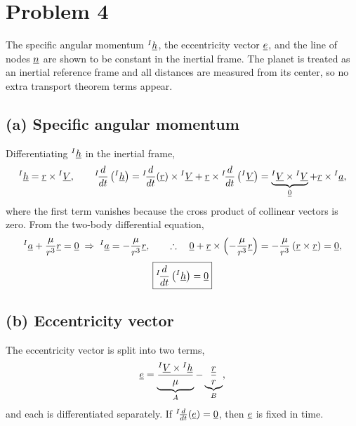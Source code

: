 \section{Problem 4}
\label{sec:problem4}

The specific angular momentum ${}^{I}\underline{h}$, the eccentricity vector $\underline{e}$, and the line of nodes $\underline{n}$ are shown to be constant in the inertial frame. The planet is treated as an inertial reference frame and all distances are measured from its center, so no extra transport theorem terms appear.

\subsection*{(a) Specific angular momentum}

Differentiating ${}^{I}\underline{h}$ in the inertial frame,
\begin{equation}
{}^{I}\underline{h} = \underline{r}\times{}^{I}\underline{V}, \qquad
{}^{I}\!\frac{d}{dt}\left({}^{I}\underline{h}\right) = {}^{I}\!\frac{d}{dt}(\underline{r})\times{}^{I}\underline{V} + \underline{r}\times{}^{I}\!\frac{d}{dt}\left({}^{I}\underline{V}\right) = \underbrace{{}^{I}\underline{V}\times{}^{I}\underline{V}}_{\underline{0}} + \underline{r}\times{}^{I}\underline{a},
\end{equation}
where the first term vanishes because the cross product of collinear vectors is zero. From the two-body differential equation,
\begin{equation}
{}^{I}\underline{a} + \frac{\mu}{r^3}\underline{r} = \underline{0} \;\Rightarrow\; {}^{I}\underline{a} = -\frac{\mu}{r^3}\underline{r},
\qquad\therefore\quad
\underline{0} + \underline{r}\times\left(-\frac{\mu}{r^3}\underline{r}\right) = -\frac{\mu}{r^3}\left(\underline{r}\times\underline{r}\right) = \underline{0},
\end{equation}
\begin{equation}
\boxed{{}^{I}\!\frac{d}{dt}\left({}^{I}\underline{h}\right) = \underline{0}}
\end{equation}

\subsection*{(b) Eccentricity vector}

The eccentricity vector is split into two terms,
\begin{equation}
\underline{e} = \underbrace{\frac{{}^{I}\underline{V}\times{}^{I}\underline{h}}{\mu}}_{A} - \underbrace{\frac{\underline{r}}{r}}_{B},
\end{equation}
and each is differentiated separately. If ${}^{I}\!\frac{d}{dt}(\underline{e}) = \underline{0}$, then $\underline{e}$ is fixed in time.

